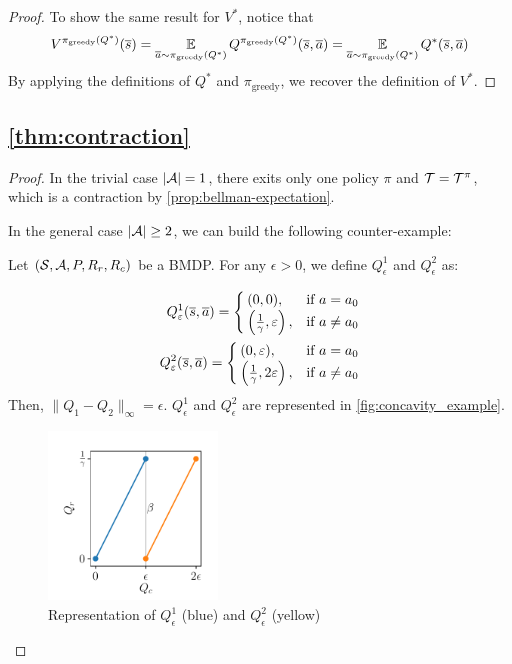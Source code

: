 \begin{subappendices}
\begin{proof}
	To show the same result for $V^*$, notice that 
	\begin{equation*}
	V^{\pi_\text{greedy}(Q^*)}(\overline{s}) = \operatorname*{\mathbb{E}}\limits_{\overline{a}\sim\pi_\text{greedy}(Q^*)}Q^{\pi_\text{greedy}(Q^*)}(\overline{s},\overline{a}) = \operatorname*{\mathbb{E}}\limits_{\overline{a}\sim\pi_\text{greedy}(Q^*)}Q^*(\overline{s},\overline{a})
	\end{equation*}
	By applying the definitions of $Q^*$ and $\pi_\text{greedy}$, we recover the definition of $V^*$.
\end{proof}

\subsection{\autoref{thm:contraction}}
\label{sec:proof_contraction}
\begin{proof}
	In the trivial case $|\mathcal{A}| = 1$, there exits only one policy $\pi$ and $\mathcal{T} = \mathcal{T}^\pi$, which is a contraction by \autoref{prop:bellman-expectation}.
	
	In the general case $|\mathcal{A}| \geq 2$, we can build the following counter-example:
	
	Let $(\mathcal{S}, \mathcal{A}, P, R_r, R_c)$ be a BMDP.
	For any $\epsilon > 0$, we define $Q_\epsilon^1$ and $Q_\epsilon^2$ as:
	
	\begin{align*}
	Q_\varepsilon^1(\overline{s},\overline{a}) =
	\begin{cases}
	(0, 0), & \text{if } a = a_0 \\
	\left(\frac{1}{\gamma}, \varepsilon\right), & \text{if } a \neq a_0
	\end{cases}\\
	Q_\varepsilon^2(\overline{s},\overline{a}) =
	\begin{cases}
	(0, \varepsilon), & \text{if } a = a_0 \\
	\left(\frac{1}{\gamma}, 2\varepsilon\right), & \text{if } a \neq a_0
	\end{cases}
	\end{align*}
	Then, $\|Q_1-Q_2\|_\infty = \epsilon$.
	$Q_\epsilon^1$ and $Q_\epsilon^2$ are represented in \autoref{fig:concavity_example}.
	
	\begin{figure}[tp]
		\centering
		\includegraphics[width=0.4\textwidth]{img/concavity_example.pdf}
		\caption{Representation of $Q_\epsilon^1$ (blue) and $Q_\epsilon^2$ (yellow)}
		\label{fig:concavity_example}
	\end{figure}
	

\end{proof}
\end{subappendices}
